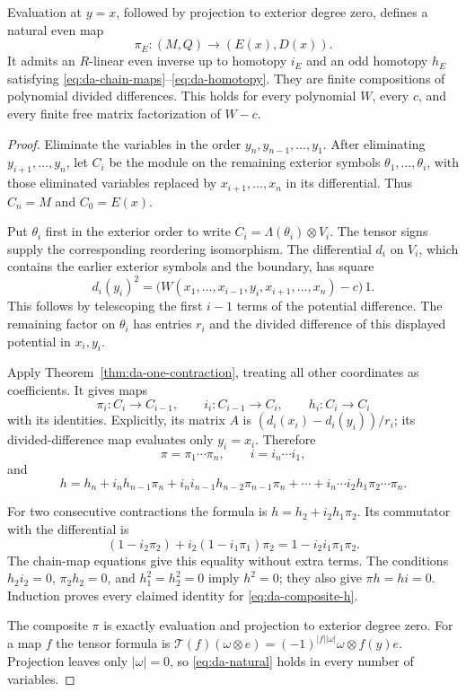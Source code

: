 \begin{theorem}
\label{thm:da-unit}
Evaluation at \(y=x\), followed by projection to exterior degree
zero, defines a natural even map
\[
 \pi_E:(M,Q)\longrightarrow(E(x),D(x)).
\]
It admits an \(R\)-linear even inverse up to homotopy \(i_E\)
and an odd homotopy \(h_E\) satisfying
\eqref{eq:da-chain-maps}--\eqref{eq:da-homotopy}.
They are finite compositions of polynomial divided differences.
This holds for every polynomial \(W\), every \(c\), and every
finite free matrix factorization of \(W-c\).
\end{theorem}
\begin{proof}
Eliminate the variables in the order \(y_n,y_{n-1},\ldots,y_1\).
After eliminating \(y_{i+1},\ldots,y_n\), let \(C_i\) be the
module on the remaining exterior symbols
\(\theta_1,\ldots,\theta_i\), with those eliminated variables
replaced by \(x_{i+1},\ldots,x_n\) in its differential.
Thus \(C_n=M\) and \(C_0=E(x)\).

Put \(\theta_i\) first in the exterior order to write
\(C_i=\Lambda(\theta_i)\otimes V_i\).
The tensor signs supply the corresponding reordering isomorphism.
The differential \(d_i\) on \(V_i\), which contains the earlier
exterior symbols and the boundary, has square
\[
 d_i(y_i)^2=
 \bigl(W(x_1,\ldots,x_{i-1},y_i,x_{i+1},\ldots,x_n)-c\bigr)\,1.
\]
This follows by telescoping the first \(i-1\) terms of the
potential difference. The remaining factor on \(\theta_i\)
has entries \(r_i\) and the divided difference of this displayed
potential in \(x_i,y_i\).

Apply Theorem~\ref{thm:da-one-contraction}, treating all other
coordinates as coefficients. It gives maps
\[
 \pi_i:C_i\to C_{i-1},\qquad
 i_i:C_{i-1}\to C_i,\qquad h_i:C_i\to C_i
\]
with its identities. Explicitly, its matrix \(A\) is
\((d_i(x_i)-d_i(y_i))/r_i\); its divided-difference map
evaluates only \(y_i=x_i\). Therefore
\[
 \pi=\pi_1\cdots\pi_n,\qquad i=i_n\cdots i_1,
\]
and
\begin{equation}
 h=h_n+i_nh_{n-1}\pi_n
       +i_ni_{n-1}h_{n-2}\pi_{n-1}\pi_n+\cdots
       +i_n\cdots i_2h_1\pi_2\cdots\pi_n .
 \label{eq:da-composite-h}
\end{equation}

For two consecutive contractions the formula is
\(h=h_2+i_2h_1\pi_2\). Its commutator with the differential is
\[
 (1-i_2\pi_2)+i_2(1-i_1\pi_1)\pi_2
   =1-i_2i_1\pi_1\pi_2.
\]
The chain-map equations give this equality without extra terms.
The conditions \(h_2i_2=0\), \(\pi_2h_2=0\), and
\(h_1^2=h_2^2=0\) imply \(h^2=0\); they also give
\(\pi h=hi=0\). Induction proves every claimed identity for
\eqref{eq:da-composite-h}.

The composite \(\pi\) is exactly evaluation and projection to
exterior degree zero. For a map \(f\) the tensor formula is
\(\mathcal T(f)(\omega\otimes e)=(-1)^{|f||\omega|}
\omega\otimes f(y)e\).
Projection leaves only \(|\omega|=0\), so
\eqref{eq:da-natural} holds in every number of variables.
\end{proof}

